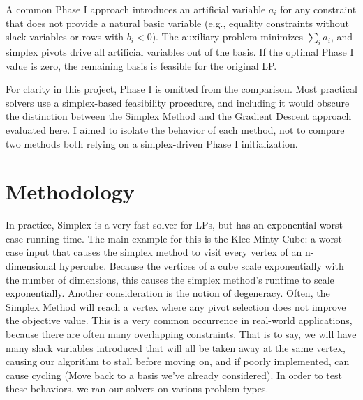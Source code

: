 \documentclass[11pt]{article}
\begin{document}
A common Phase I approach introduces an artificial variable \(a_i\) for any constraint that does not provide a natural basic variable 
(e.g., equality constraints without slack variables or rows with \(b_i < 0\)). 
The auxiliary problem minimizes \(\sum_i a_i\), and simplex pivots drive all artificial variables out of the basis. 
If the optimal Phase I value is zero, the remaining basis is feasible for the original LP.

For clarity in this project, Phase I is omitted from the comparison. 
Most practical solvers use a simplex-based feasibility procedure, and including it would obscure the distinction between the Simplex Method and the Gradient Descent approach evaluated here. I aimed to isolate the behavior of each method, not to compare two methods both relying on a simplex-driven Phase I initialization.




\section{Methodology}
In practice, Simplex is a very fast solver for LPs, but has an exponential worst-case running time. The main example for this is the Klee-Minty Cube: a worst-case input that causes the simplex method to visit every vertex of an n-dimensional hypercube. Because the vertices of a cube scale exponentially with the number of dimensions, this causes the simplex method's runtime to scale exponentially. Another consideration is the notion of degeneracy. Often, the Simplex Method will reach a vertex where any pivot selection does not improve the objective value. This is a very common occurrence in real-world applications, because there are often many overlapping constraints. That is to say, we will have many slack variables introduced that will all be taken away at the same vertex, causing our algorithm to stall before moving on, and if poorly implemented, can cause cycling (Move back to a basis we've already considered). In order to test these behaviors, we ran our solvers on various problem types.
\end{document}
